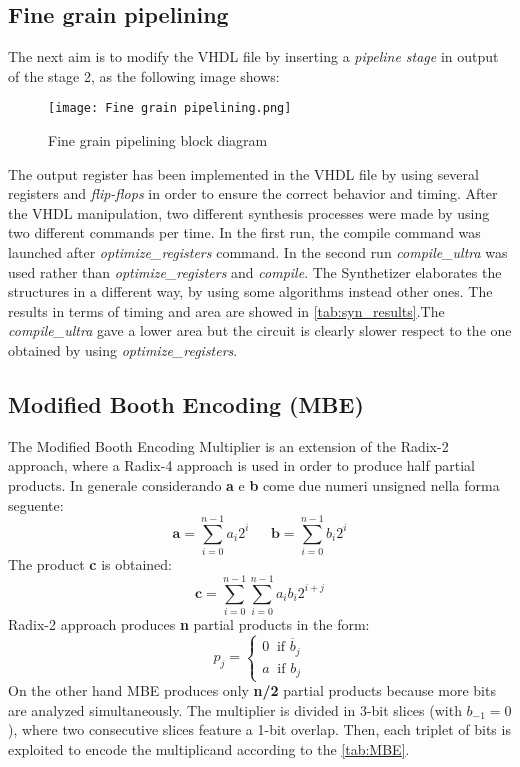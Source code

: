\subsection{Fine grain pipelining}
The next aim is to modify the VHDL file by inserting a \textit{pipeline stage} in output of the stage 2, as the following image shows:
\begin{figure}[H]
	\center
	\texttt{[image: Fine grain pipelining.png]}
	\caption{Fine grain pipelining block diagram}
	\label{fig:mult_struct}
\end{figure}
The output register has been implemented in the VHDL file by using several registers and \textit{flip-flops} in order to ensure the correct behavior and timing.  After the VHDL manipulation, two different synthesis processes were made by using two different commands per time. In the first run, the compile command was launched after \textit{optimize\_registers} command. In the second run  \textit{compile\_ultra} was used rather than \textit{optimize\_registers} and \textit{compile}. The Synthetizer elaborates the structures in a different way, by using some algorithms instead other ones. The results in terms of timing and area are showed in \autoref{tab:syn_results}.The \textit{compile\_ultra} gave a lower area but the circuit is clearly slower respect to the one obtained by using \textit{optimize\_registers}.


\subsection{Modified Booth Encoding (MBE)}
The Modified Booth Encoding Multiplier is an extension of the Radix-2 approach, where a Radix-4 approach is used in order to produce half partial products. In generale considerando \textbf{a} e \textbf{b} come due numeri unsigned nella forma seguente:
$$
\textbf{a} = \sum_{i=0}^{n-1}a_i2^i\ \ \ \ \ \ \  \textbf{b} = \sum_{i=0}^{n-1}b_i2^i
$$
The product \textbf{c} is obtained:
$$
\textbf{c} = \sum_{i=0}^{n-1}\sum_{i=0}^{n-1}a_ib_i2^{i+j}
$$
Radix-2 approach produces \textbf{n} partial products in the form:
$$
p_j = 
\begin{cases}
0 \ \textrm{  if   } \overline{b}_j\\
a \ \textrm{  if   } {b}_j
\end{cases}
$$
On the other hand MBE produces only \textbf{n/2} partial products because more bits are analyzed simultaneously. The multiplier is divided in 3-bit slices (with $b_{-1} = 0$), where two consecutive slices feature a 1-bit overlap. Then, each triplet of bits is exploited to encode the multiplicand according to the \autoref{tab:MBE}.

